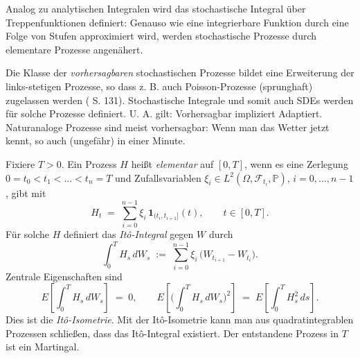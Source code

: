 Analog zu analytischen Integralen wird das stochastische Integral über Treppenfunktionen definiert:
Genauso wie eine integrierbare Funktion 
durch eine Folge von Stufen approximiert wird, werden stochastische Prozesse durch elementare Prozesse angenähert.

\begin{bem}
Die Klasse der \textit{vorhersagbaren} stochastischen Prozesse bildet eine Erweiterung der links-stetigen Prozesse, so dass 
z. B. auch Poisson-Prozesse (sprunghaft) zugelassen werden (\cite{karatzas_brownian_1991} S. 131).
Stochastische Integrale und somit auch SDEs werden für solche Prozesse definiert. U. A. gilt: Vorhersagbar impliziert Adaptiert.
Naturanaloge Prozesse sind meist vorhersagbar: Wenn man das Wetter jetzt kennt, so auch (ungefähr) in einer Minute.
\end{bem}

\begin{defi}
Fixiere $T>0$. Ein Prozess $H$ heißt \emph{elementar} auf $[0,T]$, wenn es eine 
Zerlegung $0=t_0<t_1<\dots<t_n=T$ und Zufallsvariablen $\xi_i\in L^2(\Omega,\mathcal F_{t_i},\mathbb P)$, $i=0,\dots,n-1$, gibt mit
$$
H_t \;=\; \sum_{i=0}^{n-1} \xi_i\,\mathbf 1_{(t_i,t_{i+1}]}(t),\qquad t\in[0,T].
$$
Für solche $H$ definiert das \emph{It\^o-Integral} gegen $W$ durch
$$
\int_0^T H_s\,dW_s \;:=\; \sum_{i=0}^{n-1} \xi_i\,\big(W_{t_{i+1}}-W_{t_i}\big).
$$
Zentrale Eigenschaften sind
\begin{equation}\label{eq:ito_isometry}
E\!\left[\int_0^T H_s\,dW_s\right] \;=\; 0,\qquad
E\!\left[\Big(\int_0^T H_s\,dW_s\Big)^{\!2}\right] \;=\; E\!\left[\int_0^T H_s^2\,ds\right].
\end{equation}
Dies ist die \emph{It\^o-Isometrie}. Mit der It\^o-Isometrie kann man aus quadratintegrablen Prozessen
schließen, dass das It\^o-Integral existiert. Der entstandene Prozess in $T$ ist ein Martingal.
\end{defi}

